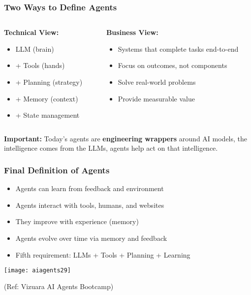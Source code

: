 \begin{frame}[fragile]\frametitle{Two Ways to Define Agents}
\begin{columns}
    \begin{column}[T]{0.5\linewidth}
        \textbf{Technical View:}
        \begin{itemize}
            \item LLM (brain)
            \item + Tools (hands)
            \item + Planning (strategy)
            \item + Memory (context)
            \item + State management
        \end{itemize}
    \end{column}
    \begin{column}[T]{0.5\linewidth}
        \textbf{Business View:}
        \begin{itemize}
            \item Systems that complete tasks end-to-end
            \item Focus on outcomes, not components
            \item Solve real-world problems
            \item Provide measurable value
        \end{itemize}
    \end{column}
\end{columns}

\vspace{0.5cm}
\textbf{Important:} Today's agents are \textbf{engineering wrappers} around AI models, the intelligence comes from the LLMs, agents help act on that intelligence.
\end{frame}


\begin{frame}[fragile]\frametitle{Final Definition of Agents}

      \begin{itemize}
        \item Agents can learn from feedback and environment
        \item Agents interact with tools, humans, and websites
        \item They improve with experience (memory)
        \item Agents evolve over time via memory and feedback
        \item Fifth requirement: LLMs + Tools + Planning + Learning
	
      \end{itemize}

		\begin{center}
		\texttt{[image: aiagents29]}
		
		{\tiny (Ref: Vizuara AI Agents Bootcamp)}
		\end{center}	

\end{frame}

